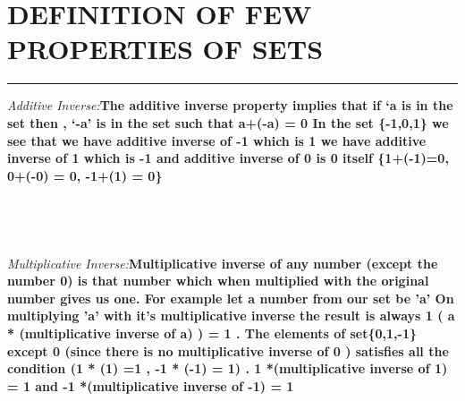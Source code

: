 \documentclass{article}
\begin{document}
\section * {DEFINITION OF FEW PROPERTIES OF SETS }
\hrule 
\bigskip


\textit{Additive Inverse:\quad}\textbf{The additive inverse property implies that if ‘a is in the set then , ‘-a’ is in the set such that a+(-a) = 0 In the set \{-1,0,1\} we see that we have additive inverse of -1 which is 1   we have additive inverse of 1 which is -1 and additive inverse of 0 is 0 itself \{1+(-1)=0, 0+(-0) = 0, -1+(1) = 0\}}
\\
\\
\\
\\
\\
\textit{Multiplicative Inverse:\quad}\textbf{Multiplicative inverse of any number (except the number 0) is that number which when multiplied with the original number gives us one. For example let a number from our set be 'a' On multiplying 'a' with it's multiplicative inverse the result is always 1 ( a * (multiplicative inverse of a) ) = 1 . The elements of  set\{0,1,-1\} except 0 (since there is no multiplicative inverse of 0 ) satisfies all the condition 
(1 * (1) =1 , -1 * (-1) = 1) . 1 *(multiplicative inverse of 1) = 1
and -1 *(multiplicative inverse of -1) = 1}

\pagebreak 
\end{document}
